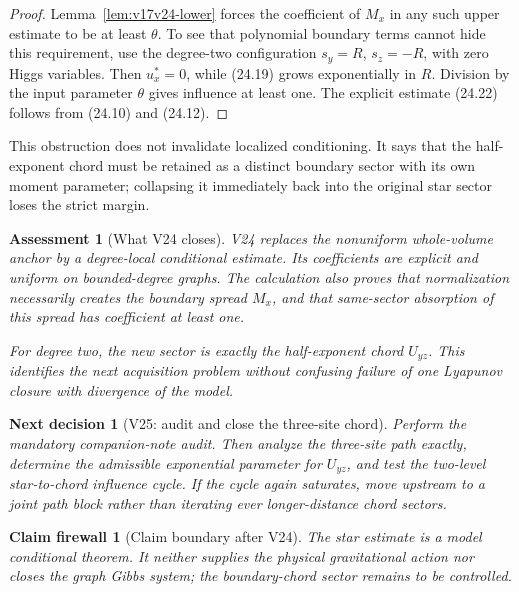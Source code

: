 \documentclass[11pt]{article}
\newtheorem{firewall}[theorem]{Claim firewall}
\newtheorem{decision}[theorem]{Next decision}
\newtheorem{assessment}[theorem]{Assessment}
\theoremstyle{remark}
\begin{document}
\begin{proof}
Lemma~\ref{lem:v17v24-lower} forces the coefficient of \(M_x\) in any
such upper estimate to be at least \(\theta\).  To see that polynomial
boundary terms cannot hide this requirement, use the degree-two
configuration \(s_y=R\), \(s_z=-R\), with zero Higgs variables.  Then
\(u_x^*=0\), while (24.19) grows exponentially in \(R\).  Division by
the input parameter \(\theta\) gives influence at least one.  The
explicit estimate (24.22) follows from (24.10) and (24.12).
\end{proof}

This obstruction does not invalidate localized conditioning.  It says
that the half-exponent chord must be retained as a distinct boundary
sector with its own moment parameter; collapsing it immediately back
into the original star sector loses the strict margin.

\begin{assessment}[What V24 closes]
\label{ass:v17v24-status}
V24 replaces the nonuniform whole-volume anchor by a degree-local
conditional estimate.  Its coefficients are explicit and uniform on
bounded-degree graphs.  The calculation also proves that normalization
necessarily creates the boundary spread \(M_x\), and that same-sector
absorption of this spread has coefficient at least one.

For degree two, the new sector is exactly the half-exponent chord
\(U_{yz}\).  This identifies the next acquisition problem without
confusing failure of one Lyapunov closure with divergence of the model.
\end{assessment}

\begin{decision}[V25: audit and close the three-site chord]
\label{dec:v17v24-next}
Perform the mandatory companion-note audit.  Then analyze the
three-site path exactly, determine the admissible exponential parameter
for \(U_{yz}\), and test the two-level star-to-chord influence cycle.
If the cycle again saturates, move upstream to a joint path block rather
than iterating ever longer-distance chord sectors.
\end{decision}

\begin{firewall}[Claim boundary after V24]
\label{fire:v17v24}
The star estimate is a model conditional theorem.  It neither supplies
the physical gravitational action nor closes the graph Gibbs system;
the boundary-chord sector remains to be controlled.
\end{firewall}
\end{document}
